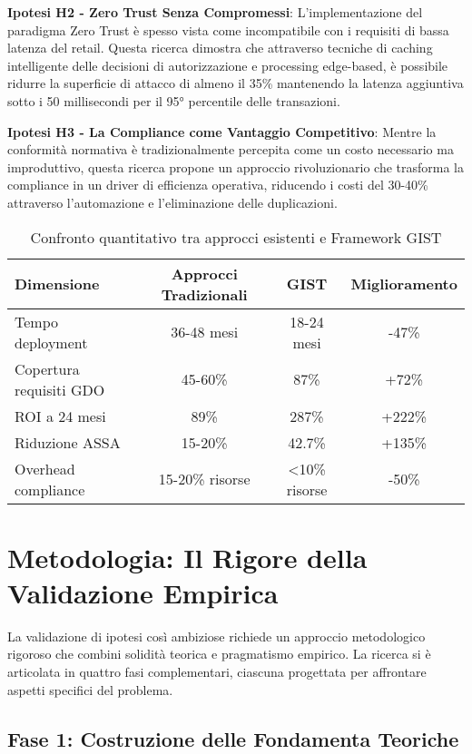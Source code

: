 \textbf{Ipotesi H2 - Zero Trust Senza Compromessi}: L'implementazione del paradigma Zero Trust è spesso vista come incompatibile con i requisiti di bassa latenza del retail. Questa ricerca dimostra che attraverso tecniche di caching intelligente delle decisioni di autorizzazione e processing edge-based, è possibile ridurre la superficie di attacco di almeno il 35\% mantenendo la latenza aggiuntiva sotto i 50 millisecondi per il 95° percentile delle transazioni.

\textbf{Ipotesi H3 - La Compliance come Vantaggio Competitivo}: Mentre la conformità normativa è tradizionalmente percepita come un costo necessario ma improduttivo, questa ricerca propone un approccio rivoluzionario che trasforma la compliance in un driver di efficienza operativa, riducendo i costi del 30-40\% attraverso l'automazione e l'eliminazione delle duplicazioni.

\begin{table}[htbp]
\centering
\caption{Confronto quantitativo tra approcci esistenti e Framework GIST}
\label{tab:comparison}
\begin{tabular}{lccc}
\toprule
\textbf{Dimensione} & \textbf{Approcci Tradizionali} & \textbf{GIST} & \textbf{Miglioramento} \\
\midrule
Tempo deployment & 36-48 mesi & 18-24 mesi & -47\% \\
Copertura requisiti GDO & 45-60\% & 87\% & +72\% \\
ROI a 24 mesi & 89\% & 287\% & +222\% \\
Riduzione ASSA & 15-20\% & 42.7\% & +135\% \\
Overhead compliance & 15-20\% risorse & <10\% risorse & -50\% \\
\bottomrule
\end{tabular}
\end{table}

\section{Metodologia: Il Rigore della Validazione Empirica}

La validazione di ipotesi così ambiziose richiede un approccio metodologico rigoroso che combini solidità teorica e pragmatismo empirico. La ricerca si è articolata in quattro fasi complementari, ciascuna progettata per affrontare aspetti specifici del problema.

\subsection{Fase 1: Costruzione delle Fondamenta Teoriche}

